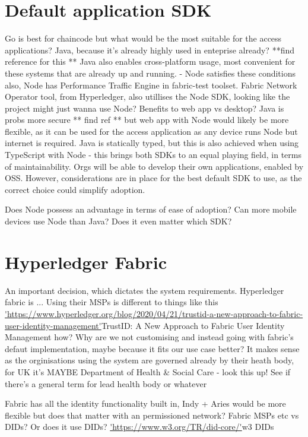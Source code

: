 \documentclass{report}
\begin{document}
\begin{flushleft}
\section{Default application SDK}
Go is best for chaincode but what would be the most suitable for the access applications? Java, because it's already highly used in enteprise already? **find reference for this ** 
Java also enables cross-platform usage, most convenient for these systems that are already up and running. - Node satisfies these conditions also, Node has Performance Traffic Engine in fabric-test toolset.
Fabric Network Operator tool, from Hyperledger, also utillises the Node SDK, looking like the project might just wanna use Node? Benefits to web app vs desktop? 
Java is probs more secure ** find ref ** but web app with Node would likely be more flexible, as it can be used for the access application as any device runs Node but internet is required.
Java is statically typed, but this is also achieved when using TypeScript with Node - this brings both SDKs to an equal playing field, in terms of maintainability.
Orgs will be able to develop their own applications, enabled by OSS. However, considerations are in place for the best default SDK to use, as the correct choice could simplify adoption.

Does Node possess an advantage in terms of ease of adoption? Can more mobile devices use Node than Java? Does it even matter which SDK? 


\section{Hyperledger Fabric}
An important decision, which dictates the system requirements. Hyperledger fabric is ... Using their MSPs is different to things like this \url{'https://www.hyperledger.org/blog/2020/04/21/trustid-a-new-approach-to-fabric-user-identity-management'}{TrustID: A New Approach to Fabric User Identity Management} how? Why are we not customising and instead going with fabric's defaut implementation, maybe because it fits our use case better? It makes sense as the orginisations using the system are governed already by their heath body, for UK it's MAYBE Department of Health \& Social Care - look this up! See if there's a general term for lead health body or whatever

Fabric has all the identity functionality built in, Indy + Aries would be more flexible but does that matter with an permissioned network? Fabric MSPs etc vs DIDs? Or does it use DIDs? \url{'https://www.w3.org/TR/did-core/'}{w3 DIDs}


\end{flushleft}
\end{document}
